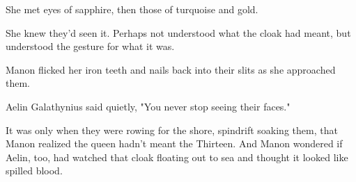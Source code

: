 She met eyes of sapphire, then those of turquoise and gold.

She knew they'd seen it. Perhaps not understood what the cloak had meant, but  understood the gesture for what it was.

Manon flicked her iron teeth and nails back into their slits as she approached them.

Aelin Galathynius said quietly, "You never stop seeing their faces."

It was only when they were rowing for the shore, spindrift soaking them, that Manon realized the queen hadn't meant the Thirteen. And Manon wondered if Aelin, too, had watched that cloak floating out to sea and thought it looked like spilled blood.
